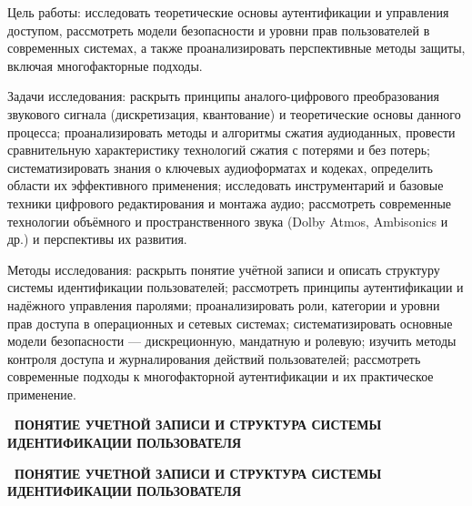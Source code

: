 \documentclass{SibFU-docs}
\begin{document}
Цель работы: исследовать теоретические основы аутентификации и управления доступом, рассмотреть модели безопасности и уровни прав пользователей в современных системах, а также проанализировать перспективные методы защиты, включая многофакторные подходы.

Задачи исследования: раскрыть принципы аналого-цифрового преобразования звукового сигнала (дискретизация, квантование) и теоретические основы данного процесса; проанализировать методы и алгоритмы сжатия аудиоданных, провести сравнительную характеристику технологий сжатия с потерями и без потерь; систематизировать знания о ключевых аудиоформатах и кодеках, определить области их эффективного применения; исследовать инструментарий и базовые техники цифрового редактирования и монтажа аудио; рассмотреть современные технологии объёмного и пространственного звука (Dolby Atmos, Ambisonics и др.) и перспективы их развития.

Методы исследования: раскрыть понятие учётной записи и описать структуру системы идентификации пользователей; рассмотреть принципы аутентификации и надёжного управления паролями; проанализировать роли, категории и уровни прав доступа в операционных и сетевых системах; систематизировать основные модели безопасности — дискреционную, мандатную и ролевую; изучить методы контроля доступа и журналирования действий пользователей; рассмотреть современные подходы к многофакторной аутентификации и их практическое применение.

\newpage
\vspace*{-2.5em}
\begin{center}\textbf{\thesection\ ПОНЯТИЕ УЧЕТНОЙ ЗАПИСИ И СТРУКТУРА СИСТЕМЫ ИДЕНТИФИКАЦИИ ПОЛЬЗОВАТЕЛЯ}\end{center}
\vspace*{-1.5em}
\begin{center}\textbf{\thesection\ ПОНЯТИЕ УЧЕТНОЙ ЗАПИСИ И СТРУКТУРА СИСТЕМЫ ИДЕНТИФИКАЦИИ ПОЛЬЗОВАТЕЛЯ}\end{center}
\vspace*{-1.5em}
\end{document}
